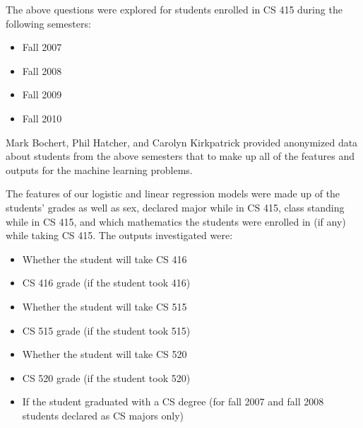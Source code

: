 \documentclass[letterpaper,11pt]{article}
\begin{document}
The above questions were explored for students enrolled in CS 415 during the following semesters:

\begin{itemize}
\item Fall 2007
\item Fall 2008
\item Fall 2009
\item Fall 2010
\end{itemize}

Mark Bochert, Phil Hatcher, and Carolyn Kirkpatrick provided anonymized data about students from the above semesters that to make up all of the features and outputs for the machine learning problems.

The features of our logistic and linear regression models were made up of the students' grades as well as sex, declared major while in CS 415, class standing while in CS 415, and which mathematics the students were enrolled in (if any) while taking CS 415.  The outputs investigated were:



\begin{itemize}
\item Whether the student will take CS 416
\item CS 416 grade (if the student took 416)
\item Whether the student will take CS 515
\item CS 515 grade (if the student took 515)
\item Whether the student will take CS 520
\item CS 520 grade (if the student took 520)
\item If the student graduated with a CS degree (for fall 2007 and fall 2008 students declared as CS majors only)
\end{itemize}
\end{document}

